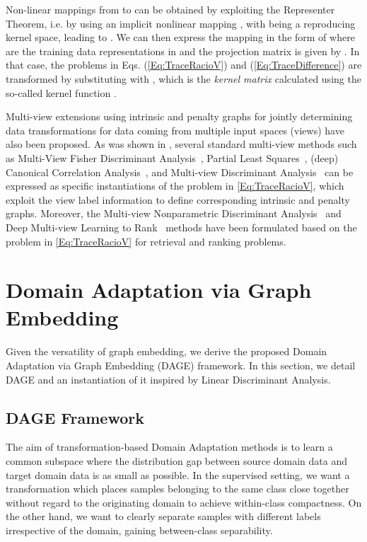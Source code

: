\documentclass[journal]{IEEEtran}
\begin{document}
Non-linear mappings from  to  can be obtained by exploiting the Representer Theorem, i.e. by using an implicit nonlinear mapping , with  being a reproducing kernel space, leading to . We can then express the mapping in the form of  where  are the training data representations in  and the projection matrix is given by . In that case, the problems in Eqs. (\ref{Eq:TraceRacioV}) and (\ref{Eq:TraceDifference}) are transformed by substituting  with , which is the \emph{kernel matrix} calculated using the so-called kernel function .

Multi-view extensions using intrinsic and penalty graphs for jointly determining data transformations for data coming from multiple input spaces (views) have also been proposed. As was shown in \cite{cao2018generalized}, several standard multi-view methods such as Multi-View Fisher Discriminant Analysis~\cite{diethe2008multiview}, Partial Least Squares~\cite{wold1984collinearity}, (deep) Canonical Correlation Analysis~\cite{andrew2013dcca}, and Multi-view Discriminant Analysis~\cite{kan2016mvda} can be expressed as specific instantiations of the problem in \cref{Eq:TraceRacioV}, which exploit the view label information to define corresponding intrinsic and penalty graphs. Moreover, the Multi-view Nonparametric Discriminant Analysis~\cite{cao2017mvnda} and Deep Multi-view Learning to Rank~\cite{cao2019deepMVLR} methods have been formulated based on the problem in \cref{Eq:TraceRacioV} for retrieval and ranking problems.




\section{Domain Adaptation via Graph Embedding}
\label{sec:dage}
Given the versatility of graph embedding, we derive the proposed Domain Adaptation via Graph Embedding (DAGE) framework. In this section, we detail DAGE and an instantiation of it inspired by Linear Discriminant Analysis.


\subsection{DAGE Framework}
The aim of transformation-based Domain Adaptation methods is to learn a common subspace where the distribution gap between source domain data and target domain data is as small as possible. In the supervised setting, we want a transformation  which places samples belonging to the same class close together without regard to the originating domain to achieve within-class compactness. On the other hand, we want  to clearly separate samples with different labels irrespective of the domain, gaining between-class separability.
\end{document}
